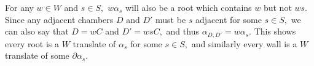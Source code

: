 \documentclass[class=book, crop=false,12 pt]{standalone}
\begin{document}
For any $w\in W$ and $s\in S,$ $w\alpha_s$ will also be a root which contains $w$ but not $ws.$ Since any adjacent chambers $D$ and $D'$ must be $s$ adjacent for some $s\in S,$ we can also say that $D=wC$ and $D'=wsC,$ and thus $\alpha_{D,D'}=w\alpha_s.$ This shows every root is a $W$ translate of $\alpha_s$ for some $s\in S,$ and similarly every wall is a $W$ translate of some $\partial\alpha_s.$ 
\end{document}
